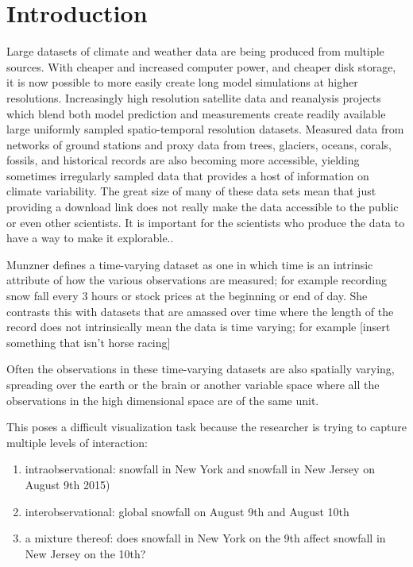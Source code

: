 \documentclass[letterpaper,onecolumn,titlepage]{Ythesis}
\title{}
\author{Machine Learning Influenced of High Dimensional Time Varying Data}
\begin{document}
\makefrontmatter

\section{Introduction}

Large datasets of climate and weather data are being produced from multiple sources. With cheaper and increased computer power, and cheaper disk storage, it is now possible to more easily create long model simulations at higher resolutions. Increasingly  high 
resolution satellite data and reanalysis projects which blend both model prediction and measurements create readily available large uniformly sampled spatio-temporal resolution datasets. Measured data from networks of ground stations and proxy data from trees, 
glaciers, oceans, corals, fossils, and historical records are also becoming more accessible, 
yielding sometimes irregularly sampled data that provides a host of 
information on climate variability. The great size of many of these data sets mean that just providing a download link does not really make the data accessible to the public or even other scientists. It is important for the scientists who produce the data to have a way to make it explorable.. 




Munzner \cite{Munzner14} defines a time-varying dataset as one in which time is an intrinsic attribute of how the various observations are measured; for example recording snow fall every 3 hours or stock prices at the beginning or end of day. She contrasts this with datasets that are amassed over time where the length of the record does not intrinsically mean the data is time varying; for example [insert something that isn't horse racing] 

Often the observations in these time-varying datasets are also spatially varying, spreading over the earth or the brain or another variable space where all the observations in the high dimensional space are of the same unit. %

This poses a difficult visualization task because the researcher is trying to capture multiple levels of interaction:
\begin{enumerate}
	\item intraobservational: snowfall in New York and snowfall in New Jersey on August 9th 2015)
	\item interobservational: global snowfall on August 9th and August 10th
	\item a mixture thereof: does snowfall in New York on the 9th affect snowfall in New Jersey on the 10th?
\end{enumerate}
\end{document}
